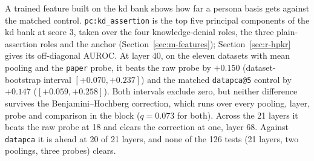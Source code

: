 A trained feature built on the kd bank shows how far a persona basis gets against the matched control. %
\texttt{pc:kd\_assertion} is the top five principal components of the kd bank at score 3, taken over the four knowledge-denial roles, the three plain-assertion roles and the anchor (Section~\ref{sec:m-features}); Section~\ref{sec:r-hpkr} gives its off-diagonal AUROC. %
At layer 40, on the eleven datasets with mean pooling and the \texttt{paper} probe, it beats the raw probe by $+0.150$ (dataset-bootstrap interval $[+0.070, +0.237]$) and the matched \texttt{datapca@5} control by $+0.147$ ($[+0.059, +0.258]$). %
Both intervals exclude zero, but neither difference survives the Benjamini--Hochberg correction, which runs over every pooling, layer, probe and comparison in the block ($q=0.073$ for both). %
Across the 21 layers it beats the raw probe at 18 and clears the correction at one, layer 68. %
Against \texttt{datapca} it is ahead at 20 of 21 layers, and none of the 126 tests (21 layers, two poolings, three probes) clears. %

